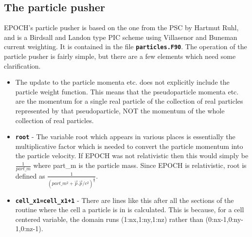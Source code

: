 \documentclass[12pt]{article}
\newcommand{\inlinecode}[1]{{\color{warwickred} \bf\texttt{#1}}}
\newcommand{\EPOCH}{{\color{warwickdark}\fontfamily{phv}\selectfont EPOCH} }
\begin{document}
\pagebreak

\subsection{The particle pusher}
EPOCH's particle pusher is based on the one from the PSC by Hartmut Ruhl, and
is a Birdsall and Landon type PIC scheme using Villasenor and Buneman current
weighting. It is contained in the file \inlinecode{particles.F90}. The
operation of the particle pusher is fairly simple, but there are a few elements
which need some clarification.
\begin{itemize}
\item The update to the particle momenta etc. does not explicitly include the
  particle weight function. This means that the pseudoparticle momenta etc. are
  the momentum for a single real particle of the collection of real particles
  represented by that pseudoparticle, NOT the momentum of the whole collection
  of real particles.
\item \inlinecode{root} - The variable root which appears in various places is
  essentially the multiplicative factor which is needed to convert the particle
  momentum into the particle velocity. If \EPOCH was not relativistic then this
  would simply be $\frac{1}{part\_m}$ where part\_m is the particle mass. Since
  \EPOCH is relativistic, root is defined as $\frac{1}{(part\_m^2 +
    \vec{p}.\vec{p}/c^2)^\frac{1}{2}}$.
\item \inlinecode{cell\_x1=cell\_x1+1} - There are lines like this after all
  the sections of the routine where the cell a particle is in is
  calculated. This is because, for a cell centered variable, the domain runs
  (1:nx,1:ny,1:nz) rather than (0:nx-1,0:ny-1,0:nz-1).
\end{itemize}
\end{document}
